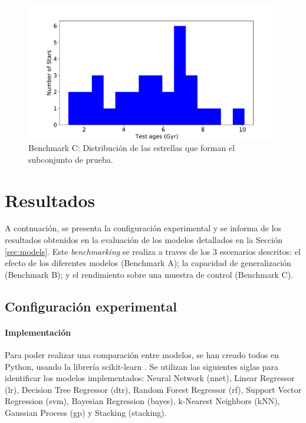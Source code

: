\begin{figure}[H]
\begin{center}
 \includegraphics[width=0.8\linewidth]{Figuras/Experimentos/B_C_test.pdf}
\end{center}
\caption{Benchmark C: Distribución de las estrellas que forman el subconjunto de prueba.}
 \label{fig:benchC_test}
\end{figure}


\section{Resultados}
\label{sec:results}
A contnuación, se presenta la configuración experimental y se informa de los resultados obtenidos en la evaluación de los modelos detallados en la Sección \ref{sec:models}. Este \emph{benchmarking} se realiza a traves de los 3 escenarios descritos: el efecto de los diferentes modelos (Benchmark A); la capacidad de generalización (Benchmark B); y el rendimiento sobre una muestra de control (Benchmark C).

\subsection{Configuración experimental}

\paragraph{Implementación} 
Para poder realizar una comparación entre modelos, se han creado todos en Python, usando la librería scikit-learn \cite{scikit-learn}. Se utilizan las siguientes siglas para identificar los modelos implementados: Neural Network (nnet), Linear Regressor (lr), Decision Tree Regressor (dtr), Random Forest Regressor (rf), Support Vector Regression (svm), Bayesian Regression (bayes), k-Nearest Neighbors (kNN), Gaussian Process (gp) y Stacking (stacking).


